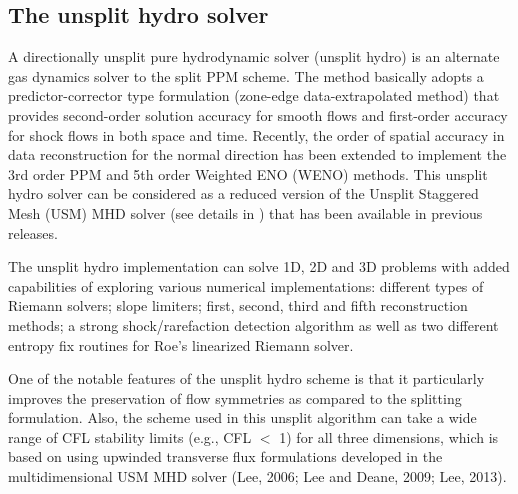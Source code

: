 \subsection{The unsplit hydro solver}
\label{Sec:MUSCL-Hancock}
\label{Sec:unsplit hydro algorithm}
A directionally unsplit pure hydrodynamic solver (unsplit hydro) is an alternate gas dynamics solver to 
the split PPM scheme.
The method basically adopts a predictor-corrector type formulation (zone-edge data-extrapolated method) that provides
second-order solution accuracy for smooth flows and first-order accuracy for shock flows in both space and time. 
Recently, the order of spatial accuracy in data reconstruction for the normal direction has been
extended to implement the 3rd order PPM and 5th order Weighted ENO (WENO) methods.
This unsplit hydro solver can be considered as a reduced version of the Unsplit Staggered Mesh (USM) MHD solver 
(see details in ) that has been
available in previous \flashx releases.

The unsplit hydro implementation can solve 1D, 2D and 3D problems with added capabilities of
exploring various numerical implementations:
different types of Riemann solvers; slope limiters; first, second, third and fifth reconstruction
methods; a strong shock/rarefaction detection algorithm %
as well as two different entropy fix routines 
for Roe's linearized Riemann solver.

One of the notable features of the unsplit hydro scheme is that it particularly improves 
the preservation of flow symmetries as compared
to the splitting formulation. Also, the scheme used in this unsplit algorithm
can take a wide range of CFL stability limits (e.g., CFL $<$ 1) for
all three dimensions, which is based on using upwinded transverse flux formulations
developed in the multidimensional USM MHD solver (Lee, 2006; Lee and Deane, 2009; Lee,  2013).


